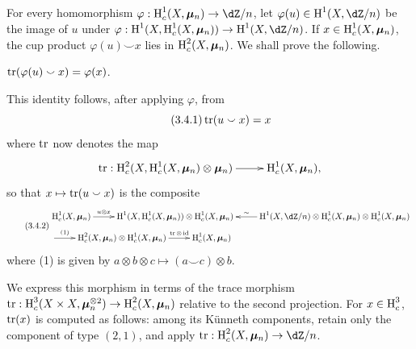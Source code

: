 \subsection{}\label{V:3-3}

For every homomorphism $\varphi:\h_c^1(X,\dmu_n)\to \dZ/n$, let
$\varphi(u)\in \h^1(X,\dZ/n)$ be the image of $u$ under
$\varphi:\h^1(X,\h_c^1(X,\dmu_n)) \to \h^1(X,\dZ/n)$. If
$x\in \operatorname{H}_c^1(X,{\bm\mu}_n)$, the cup product $\varphi(u)\smallsmile x$ lies in
$\operatorname{H}_c^2(X,{\bm\mu}_n)$. We shall prove the following.


\begin{proposition_}\label{V:3-4}
$\operatorname{tr}(\varphi(u)\smallsmile x) = \varphi(x)$.
\end{proposition_}

This identity follows, after applying $\varphi$, from
\begin{equation*}\tag{3.4.1}\label{V:eq:3-4-1}
  \operatorname{tr}(u\smallsmile x) = x
\end{equation*}
where $\operatorname{tr}$ now denotes the map
\[\xymatrix{
  \tr:\h_c^2(X,\h_c^1(X,\dmu_n)\otimes\dmu_n) \ar[r]
    & \h_c^1(X,\dmu_n) \text{,}
}\]
so that $x\mapsto \operatorname{tr}(u\smallsmile x)$ is the composite
\small
\begin{equation*}\tag{3.4.2}\label{V:eq:3-4-2}
\begin{aligned}
&\xymatrix{
  \h_c^1(X,\dmu_n) \ar[r]^-{u\otimes x}
    & \h^1(X,\h_c^1(X,\dmu_n)) \otimes \h_c^1(X,\dmu_n)
    & \ar[l]_-\sim \h^1(X,\dZ/n)\otimes \h_c^1(X,\dmu_n) \otimes \h_c^1(X,\dmu_n)} \\ &\xymatrix{
    \ar[r]^-{(1)}
      & \h_c^2(X,\dmu_n) \otimes \h_c^1(X,\dmu_n) \ar[r]^-{\tr\otimes\operatorname{id}}
      & \h_c^1(X,\dmu_n)
}
\end{aligned}
\end{equation*}
\normalsize
where (1) is given by
$a\otimes b\otimes c\mapsto (a\smallsmile c)\otimes b$.

We express this morphism in terms of the trace morphism
$\operatorname{tr}:\operatorname{H}_c^3(X\times X,{\bm\mu}_n^{\otimes 2}) \to \operatorname{H}_c^2(X,{\bm\mu}_n)$ relative to
the second projection. For $x\in \operatorname{H}_c^3$, $\operatorname{tr}(x)$ is computed as follows:
among its K\"unneth components, retain only the component of type $(2,1)$,
and apply $\tr:\h_c^2(X,\dmu_n) \to \dZ/n$.


